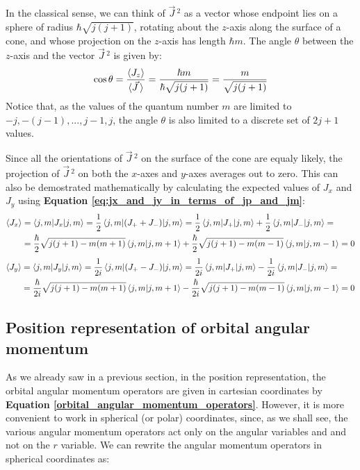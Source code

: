 In the classical sense, we can think of $\vec{J}\,^2$ as a vector whose endpoint lies on a sphere of radius $\hbar\sqrt{j(j+1)}$, rotating about the $z$-axis along the surface of a cone, and whose projection on the $z$-axis has length $\hbar m$. The angle $\theta$ between the $z$-axis and the vector $\vec{J}\,^2$ is given by:
\begin{equation}
    \cos\theta = \frac{\braket{J_z}}{\braket{\vec{J}\,}} = \frac{\hbar m}{\hbar\sqrt{j(j+1)}} = \frac{m}{\sqrt{j(j+1)}}
\end{equation}
Notice that, as the values of the quantum number $m$ are limited to $-j, -(j-1), ..., j-1, j$, the angle $\theta$ is also limited to a discrete set of $2j+1$ values.

Since all the orientations of $\vec{J}\,^2$ on the surface of the cone are equaly likely, the projection of $\vec{J}\,^2$ on both the $x$-axes and $y$-axes averages out to zero. This can also be demostrated mathematically by calculating the expected values of $J_x$ and $J_y$ using \textbf{Equation \ref{eq:jx_and_jy_in_terms_of_jp_and_jm}}:
\begin{equation}
    \begin{split}
        \braket{J_x} &= \braket{j,m|J_x|j,m} = \frac12\braket{j,m|(J_+ + J_-)|j,m} = \frac12\braket{j,m|J_+|j,m} + \frac12\braket{j,m|J_-|j,m} = \\
        &= \frac{\hbar}{2}\sqrt{j(j+1)-m(m+1)}\braket{j,m|j,m+1} + \frac{\hbar}{2}\sqrt{j(j+1)-m(m-1)}\braket{j,m|j,m-1} = 0
    \end{split}
\end{equation}
\begin{equation}
    \begin{split}
        \braket{J_y} &= \braket{j,m|J_y|j,m} = \frac{1}{2i}\braket{j,m|(J_+ - J_-)|j,m} = \frac{1}{2i}\braket{j,m|J_+|j,m} - \frac{1}{2i}\braket{j,m|J_-|j,m} = \\
        &= \frac{\hbar}{2i}\sqrt{j(j+1)-m(m+1)}\braket{j,m|j,m+1} - \frac{\hbar}{2i}\sqrt{j(j+1)-m(m-1)}\braket{j,m|j,m-1} = 0
    \end{split}
\end{equation}

\subsection{Position representation of orbital angular momentum}

As we already saw in a previous section, in the position representation, the orbital angular momentum operators are given in cartesian coordinates by \textbf{Equation \ref{orbital_angular_momentum_operators}}. However, it is more convenient to work in spherical (or polar) coordinates, since, as we shall see, the various angular momentum operators act only on the angular variables and and not on the $r$ variable. We can rewrite the angular momentum operators in spherical coordinates as:

